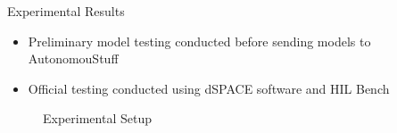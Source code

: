 \documentclass[final]{beamer}
\newlength{\onecolwid}
\begin{document}
\begin{frame}[t]
\begin{columns}[t]
\begin{column}{\onecolwid}
\begin{alertblock}{Experimental Results}
\vskip 1cm
\begin{itemize}
    \item Preliminary model testing conducted before sending models to AutonomouStuff 
    \item Official testing conducted using dSPACE software and HIL Bench 
\end{itemize}
\begin{figure}
    \centering
    \caption{Experimental Setup}
    \label{fig:Setup}
\end{figure}


\end{alertblock}
\end{column}
\end{columns}
\end{frame}
\end{document}
